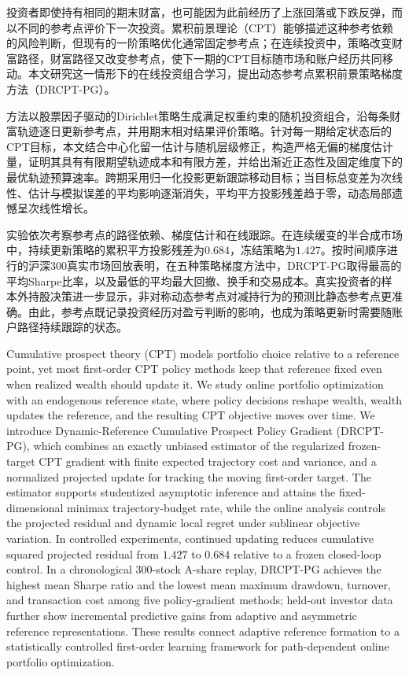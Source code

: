 \begin{abstractCN}
投资者即使持有相同的期末财富，也可能因为此前经历了上涨回落或下跌反弹，而以不同的参考点评价下一次投资。累积前景理论（CPT）能够描述这种参考依赖的风险判断，但现有的一阶策略优化通常固定参考点；在连续投资中，策略改变财富路径，财富路径又改变参考点，使下一期的CPT目标随市场和账户经历共同移动。本文研究这一情形下的在线投资组合学习，提出动态参考点累积前景策略梯度方法（DRCPT-PG）。

方法以股票因子驱动的Dirichlet策略生成满足权重约束的随机投资组合，沿每条财富轨迹逐日更新参考点，并用期末相对结果评价策略。针对每一期给定状态后的CPT目标，本文结合中心化留一估计与随机层级修正，构造严格无偏的梯度估计量，证明其具有有限期望轨迹成本和有限方差，并给出渐近正态性及固定维度下的最优轨迹预算速率。跨期采用归一化投影更新跟踪移动目标；当目标总变差为次线性、估计与模拟误差的平均影响逐渐消失，平均平方投影残差趋于零，动态局部遗憾呈次线性增长。

实验依次考察参考点的路径依赖、梯度估计和在线跟踪。在连续缓变的半合成市场中，持续更新策略的累积平方投影残差为$0.684$，冻结策略为$1.427$。按时间顺序进行的沪深300真实市场回放表明，在五种策略梯度方法中，DRCPT-PG取得最高的平均Sharpe比率，以及最低的平均最大回撤、换手和交易成本。真实投资者的样本外持股决策进一步显示，非对称动态参考点对减持行为的预测比静态参考点更准确。由此，参考点既记录投资经历对盈亏判断的影响，也成为策略更新时需要随账户路径持续跟踪的状态。

\end{abstractCN}

\begin{abstractEN}
Cumulative prospect theory (CPT) models portfolio choice relative to a reference point, yet most first-order CPT policy methods keep that reference fixed even when realized wealth should update it.  We study online portfolio optimization with an endogenous reference state, where policy decisions reshape wealth, wealth updates the reference, and the resulting CPT objective moves over time.  We introduce Dynamic-Reference Cumulative Prospect Policy Gradient (DRCPT-PG), which combines an exactly unbiased estimator of the regularized frozen-target CPT gradient with finite expected trajectory cost and variance, and a normalized projected update for tracking the moving first-order target.  The estimator supports studentized asymptotic inference and attains the fixed-dimensional minimax trajectory-budget rate, while the online analysis controls the projected residual and dynamic local regret under sublinear objective variation.  In controlled experiments, continued updating reduces cumulative squared projected residual from $1.427$ to $0.684$ relative to a frozen closed-loop control.  In a chronological 300-stock A-share replay, DRCPT-PG achieves the highest mean Sharpe ratio and the lowest mean maximum drawdown, turnover, and transaction cost among five policy-gradient methods; held-out investor data further show incremental predictive gains from adaptive and asymmetric reference representations.  These results connect adaptive reference formation to a statistically controlled first-order learning framework for path-dependent online portfolio optimization.
\end{abstractEN}
